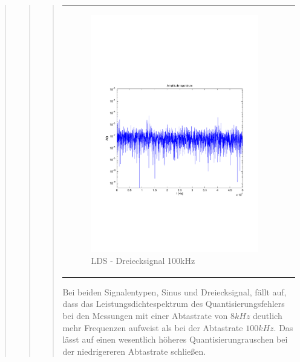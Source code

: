 \begin{quote}
\begin{quote}
\begin{quote}
\begin{center}
\begin{tabular}{ll}
                \begin{minipage}{0.6\textwidth}
                    \begin{figure}[H]
                        \includegraphics[scale=0.4, trim = 1.5cm 7cm 1.5cm 8cm, clip]
                        {./Bilder/drei100_Quantisierungsfehler_LDS}
                          \caption{LDS - Dreiecksignal 100kHz}
                    \end{figure}
                \end{minipage}
            
            \end{tabular}
        \end{center}
        \vspace{1em}
			
		Bei beiden Signalentypen, Sinus und Dreiecksignal, fällt auf, dass das Leistungsdichtespektrum des
		Quantisierungsfehlers bei den Messungen mit einer Abtastrate von $8 kHz$ deutlich mehr Frequenzen aufweist als bei
		der Abtastrate $100 kHz$. Das lässt auf einen wesentlich höheres Quantisierungrauschen bei der niedrigereren
		Abtastrate schließen.
		\vspace{1em}
		

\end{quote}
\end{quote}
\end{quote}
